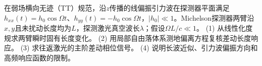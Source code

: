 在弱场横向无迹（TT）规范，沿\(z\)传播的线偏振引力波在探测器平面满足\(h_{xx}(t)=h_0\cos\Omega t\)、\(h_{yy}(t)=-h_0\cos\Omega t\)，\(|h_0|\ll1\)。Michelson探测器两臂沿\(x,y\)且未扰动长度均为\(L\)，探测激光真空波长\(\lambda\)；假设\(\Omega L/c\ll1\)。
(1) 从线性化度规求两臂瞬时固有长度变化。
(2) 用局部自由落体系测地偏离方程复核差动长度响应。
(3) 求往返激光的主阶差动相位信号。
(4) 说明长波近似、引力波偏振方向和高频响应函数的限制。
